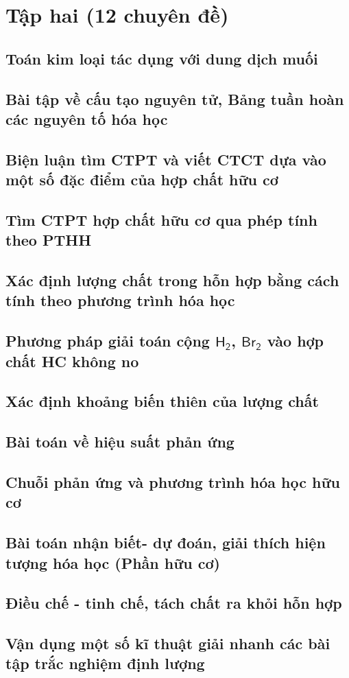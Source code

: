 \documentclass[Main.tex]{subfiles}
\begin{document}
\chapter{Tập hai (12 chuyên đề)}
\setcounter{section}{10}
\section{Toán kim loại tác dụng với dung dịch muối}
\section{Bài tập về cấu tạo nguyên tử, Bảng tuần hoàn các nguyên tố hóa học}
\section{Biện luận tìm CTPT và viết CTCT dựa vào một số đặc điểm của hợp chất hữu cơ}
\section{Tìm CTPT hợp chất hữu cơ qua phép tính theo PTHH}
\section{Xác định lượng chất trong hỗn hợp bằng cách tính theo phương trình hóa học}
\section{Phương pháp giải toán cộng $\mathsf{H_2}$, $\mathsf{Br_2}$ vào hợp chất HC không no}
\section{Xác định khoảng biến thiên của lượng chất}
\section{Bài toán về hiệu suất phản ứng}
\section{Chuỗi phản ứng và phương trình hóa học hữu cơ}
\section{Bài toán nhận biết- dự đoán, giải thích hiện tượng hóa học (Phần hữu cơ)}
\section{Điều chế - tinh chế, tách chất ra khỏi hỗn hợp}
\section{Vận dụng một số kĩ thuật giải nhanh các bài tập trắc nghiệm định lượng}
\end{document}
